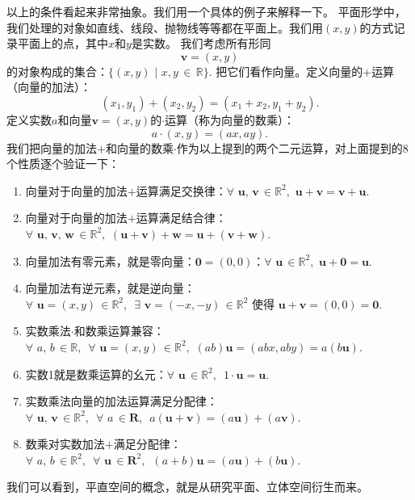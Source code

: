 \documentclass[12pt,UTF8]{ctexbook}
\begin{document}
以上的条件看起来非常抽象。我们用一个具体的例子来解释一下。
平面形学中，我们处理的对象如直线、线段、抛物线等等都在平面上。我们用$(x,y)$的方式记录平面上的点，其中$x$和$y$是实数。
我们考虑所有形同
$$ \mathbf{v} = (x, y)$$
的对象构成的集合：$\{(x, y) \,\,|\,\, x,y\,\in\,\mathbb{R}\}.$ 把它们看作向量。定义向量的$+$运算（向量的加法）：
$$ (x_1, y_1) + (x_2, y_2) = (x_1+x_2, y_1+y_2).$$
定义实数$a$和向量$ \mathbf{v} = (x, y)$的$\cdot$运算（称为向量的数乘）：
$$ a \cdot (x, y) = (ax, ay).$$
我们把向量的加法$+$和向量的数乘$\cdot$作为以上提到的两个二元运算，对上面提到的8个性质逐个验证一下：
\begin{enumerate}
    \item 向量对于向量的加法$+$运算满足交换律：$\forall \,\, \mathbf{u}, \, \mathbf{v} \, \in \mathbb{R}^2, \,\, \mathbf{u} + \mathbf{v} = \mathbf{v} + \mathbf{u}.$
    \item 向量对于向量的加法$+$运算满足结合律：$\forall \,\, \mathbf{u}, \, \mathbf{v}, \, \mathbf{w} \, \in \mathbb{R}^2, \,\, (\mathbf{u} + \mathbf{v}) + \mathbf{w} = \mathbf{u} + (\mathbf{v} + \mathbf{w}).$
    \item 向量加法有零元素，就是零向量：$\mathbf{0} = (0, 0)$：$\forall \,\, \mathbf{u} \, \in \mathbb{R}^2, \,\, \mathbf{u} + \mathbf{0} = \mathbf{u}.$
    \item 向量加法有逆元素，就是逆向量：$\forall \,\, \mathbf{u} = (x, y) \, \in \mathbb{R}^2, \,\,\, \exists \,\, \mathbf{v} = (-x, -y)\, \in \mathbb{R}^2$ 使得 $\mathbf{u} + \mathbf{v} = (0, 0) = \mathbf{0}.$
    \item 实数乘法$\cdot$和数乘运算兼容：$\forall \,\, a, \, b \, \in \mathbb{R}, \,\,\, \forall \,\, \mathbf{u} = (x, y) \, \in \mathbb{R}^2, \,\, (ab)\mathbf{u} = (abx, aby)= a(b\mathbf{u}).$
    \item 实数1就是数乘运算的幺元：$\forall \,\, \mathbf{u} \, \in \mathbb{R}^2, \,\,\, 1\cdot \mathbf{u} = \mathbf{u}. $
    \item 实数乘法向量的加法运算满足分配律：$\forall \,\, \mathbf{u}, \, \mathbf{v} \, \in \mathbb{R}^2, \,\,\, \forall \,\, a \, \in \mathbf{R}, \,\,\, a(\mathbf{u} + \mathbf{v}) = (a \mathbf{u}) + (a \mathbf{v}). $
    \item 数乘对实数加法$+$满足分配律：$\forall \,\, a, \, b \, \in \mathbb{R}^2, \,\,\, \forall \,\, \mathbf{u} \, \in \mathbf{R}^2, \,\,\, (a + b)\mathbf{u} = (a \mathbf{u}) + (b \mathbf{u}). $
\end{enumerate}

我们可以看到，平直空间的概念，就是从研究平面、立体空间衍生而来。
\end{document}

